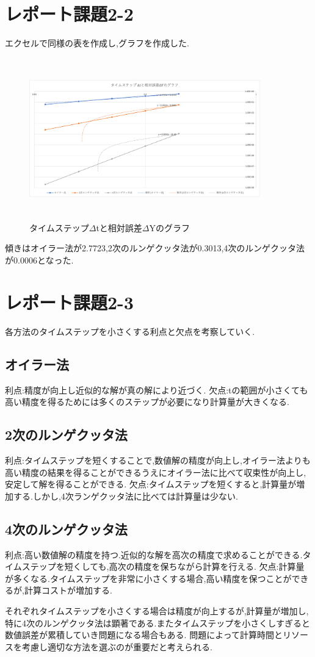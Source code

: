 \documentclass[a4j,10pt,dvipdfmx]{jarticle}
\begin{document}
\section{レポート課題2-2}
エクセルで同様の表を作成し,グラフを作成した.
\begin{figure}[H]
  \begin{center}
  \includegraphics[height=7cm,width=10cm]{2-2.png}
  \caption{タイムステップ$\Delta$tと相対誤差$\Delta$Yのグラフ}
\end{center}
\end{figure}
傾きはオイラー法が2.7723,2次のルンゲクッタ法が0.3013,4次のルンゲクッタ法が0.0006となった.
\section{レポート課題2-3}
各方法のタイムステップを小さくする利点と欠点を考察していく.
\subsection{オイラー法}
利点:精度が向上し近似的な解が真の解により近づく.
欠点:tの範囲が小さくても高い精度を得るためには多くのステップが必要になり計算量が大きくなる.
\subsection{2次のルンゲクッタ法}
利点:タイムステップを短くすることで,数値解の精度が向上し,オイラー法よりも高い精度の結果を得ることができるうえにオイラー法に比べて収束性が向上し,安定して解を得ることができる.
欠点:タイムステップを短くすると,計算量が増加する.しかし,4次ランゲクッタ法に比べては計算量は少ない.
\subsection{4次のルンゲクッタ法}
利点:高い数値解の精度を持つ.近似的な解を高次の精度で求めることができる.タイムステップを短くしても,高次の精度を保ちながら計算を行える.
欠点:計算量が多くなる.タイムステップを非常に小さくする場合,高い精度を保つことができるが,計算コストが増加する.

それぞれタイムステップを小さくする場合は精度が向上するが,計算量が増加し,特に4次のルンゲクッタ法は顕著である.またタイムステップを小さくしすぎると数値誤差が累積していき問題になる場合もある.
問題によって計算時間とリソースを考慮し適切な方法を選ぶのが重要だと考えられる.
\end{document}
